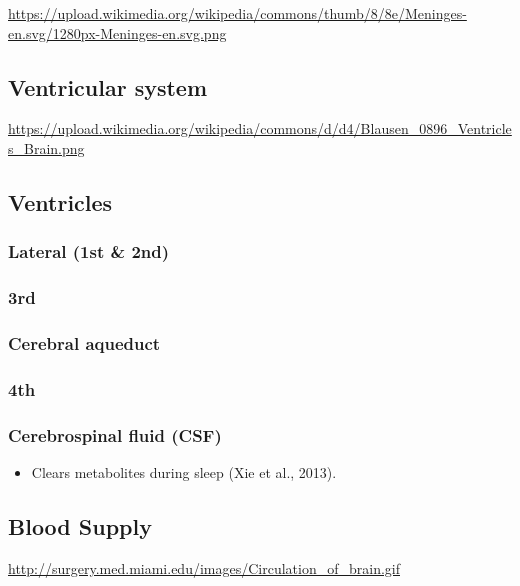 \documentclass[]{article}
\providecommand{\tightlist}{%
  \setlength{\itemsep}{0pt}\setlength{\parskip}{0pt}}
\begin{document}
\url{https://upload.wikimedia.org/wikipedia/commons/thumb/8/8e/Meninges-en.svg/1280px-Meninges-en.svg.png}

\subsection{Ventricular system}\label{ventricular-system-1}

\url{https://upload.wikimedia.org/wikipedia/commons/d/d4/Blausen_0896_Ventricles_Brain.png}

\subsection{Ventricles}\label{ventricles}

\subsubsection{Lateral (1st \& 2nd)}\label{lateral-1st-2nd}

\subsubsection{3rd}\label{rd}

\subsubsection{Cerebral aqueduct}\label{cerebral-aqueduct}

\subsubsection{4th}\label{th}

\subsubsection{Cerebrospinal fluid (CSF)}\label{cerebrospinal-fluid-csf}

\begin{itemize}
\tightlist
\item
  Clears metabolites during sleep (Xie et al., 2013).
\end{itemize}

\subsection{Blood Supply}\label{blood-supply-1}

\url{http://surgery.med.miami.edu/images/Circulation_of_brain.gif}
\end{document}

